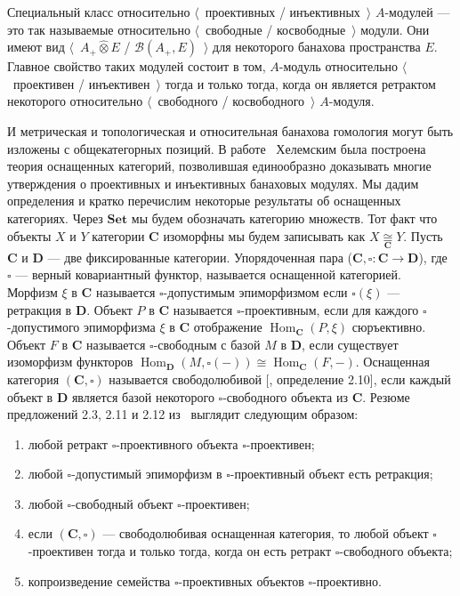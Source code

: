 \documentclass[12pt]{article}
\newcommand{\projtens}{\mathbin{\widehat{\otimes}}}
\newcommand{\isom}[1]{\mathop{\mathbin{\cong}}\limits_{#1}}
\begin{document}
Специальный класс относительно $\langle$~проективных / инъективных~$\rangle$
$A$-модулей --- это так называемые относительно $\langle$~свободные /
косвободные~$\rangle$ модули. Они имеют вид $\langle$~$A_+\projtens E$ /
$\mathcal{B}(A_+,E)$~$\rangle$ для некоторого банахова пространства $E$. Главное
свойство таких модулей состоит в том, $A$-модуль относительно
$\langle$~проективен / инъективен~$\rangle$ тогда и только тогда, когда он
является ретрактом некоторого относительно $\langle$~свободного /
косвободного~$\rangle$ $A$-модуля.

И метрическая и топологическая и относительная банахова гомология могут быть
изложены с общекатегорных позиций. В работе~\cite{HelMetrFrQMod} Хелемским была
построена теория оснащенных категорий, позволившая единообразно доказывать
многие утверждения о проективных и инъективных банаховых модулях. Мы дадим
определения и кратко перечислим некоторые результаты об оснащенных категориях.
Через $\mathbf{Set}$ мы будем обозначать категорию множеств. Тот факт что
объекты $X$ и $Y$ категории $\mathbf{C}$ изоморфны мы будем записывать как
$X\isom{\mathbf{C}}Y$. Пусть $\mathbf{C}$ и $\mathbf{D}$ --- две фиксированные
категории. Упорядоченная пара ($\mathbf{C}, \square:\mathbf{C}\to\mathbf{D}$),
где $\square$ --- верный ковариантный функтор, называется оснащенной категорией.
Морфизм $\xi$ в $\mathbf{C}$ называется $\square$-допустимым эпиморфизмом если
$\square (\xi)$ --- ретракция в $\mathbf{D}$. Объект $P$ в $\mathbf{C}$
называется $\square$-проективным, если для каждого $\square$-допустимого
эпиморфизма $\xi$ в $\mathbf{C}$ отображение
$\operatorname{Hom}_{\mathbf{C}}(P,\xi)$ сюръективно. Объект $F$ в $\mathbf{C}$
называется $\square$-свободным с базой $M$ в  $\mathbf{D}$, если существует
изоморфизм функторов
$\operatorname{Hom}_{\mathbf{D}}(M,\square(-))
    \cong\operatorname{Hom}_{\mathbf{C}}(F,-)$.
Оснащенная категория $(\mathbf{C},\square)$ называется свободолюбивой
[\cite{HelMetrFrQMod}, определение 2.10], если каждый объект в $\mathbf{D}$
является базой некоторого $\square$-свободного объекта из $\mathbf{C}$. Резюме
предложений 2.3, 2.11  и 2.12 из~\cite{HelMetrFrQMod} выглядит следующим
образом:
\begin{enumerate}[label = (\roman*)]
    \item любой ретракт $\square$-проективного объекта $\square$-проективен;

    \item любой $\square$-допустимый эпиморфизм в $\square$-проективный объект есть
          ретракция;

    \item любой $\square$-свободный объект $\square$-проективен;

    \item если $(\mathbf{C},\square)$ --- свободолюбивая оснащенная категория, то
          любой объект $\square$-проективен тогда и только тогда, когда он есть ретракт
          $\square$-свободного объекта;

    \item копроизведение семейства $\square$-проективных объектов
          $\square$-проективно.
\end{enumerate}
\end{document}
